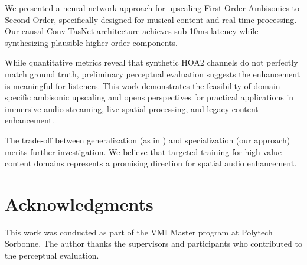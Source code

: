 \documentclass[10pt,twocolumn]{article}
\begin{document}
We presented a neural network approach for upscaling First Order Ambisonics to Second Order, specifically designed for musical content and real-time processing. Our causal Conv-TasNet architecture achieves sub-10ms latency while synthesizing plausible higher-order components.

While quantitative metrics reveal that synthetic HOA2 channels do not perfectly match ground truth, preliminary perceptual evaluation suggests the enhancement is meaningful for listeners. This work demonstrates the feasibility of domain-specific ambisonic upscaling and opens perspectives for practical applications in immersive audio streaming, live spatial processing, and legacy content enhancement.

The trade-off between generalization (as in \cite{nawfal2025ambisonics}) and specialization (our approach) merits further investigation. We believe that targeted training for high-value content domains represents a promising direction for spatial audio enhancement.

\section*{Acknowledgments}

This work was conducted as part of the VMI Master program at Polytech Sorbonne. The author thanks the supervisors and participants who contributed to the perceptual evaluation.
\end{document}
